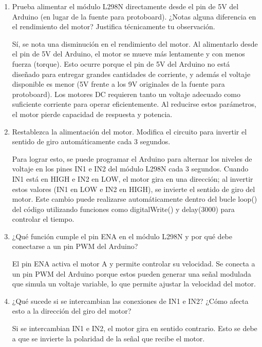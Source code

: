 \begin{enumerate}
    \item Prueba alimentar el módulo L298N directamente desde el pin de 5V del Arduino (en lugar de la fuente para protoboard). ¿Notas alguna diferencia en el rendimiento del motor? Justifica técnicamente tu observación.

    Sí, se nota una disminución en el rendimiento del motor. Al alimentarlo desde el pin de 5V del Arduino, el motor se mueve más lentamente y con menos fuerza (torque). Esto ocurre porque el pin de 5V del Arduino no está diseñado para entregar grandes cantidades de corriente, y además el voltaje disponible es menor (5V frente a los 9V originales de la fuente para protoboard). Los motores DC requieren tanto un voltaje adecuado como suficiente corriente para operar eficientemente. Al reducirse estos parámetros, el motor pierde capacidad de respuesta y potencia.

    \item Restablezca la alimentación del motor. Modiﬁca el circuito para invertir el sentido de giro automáticamente cada 3 segundos.

    Para lograr esto, se puede programar el Arduino para alternar los niveles de voltaje en los pines IN1 e IN2 del módulo L298N cada 3 segundos. Cuando IN1 está en HIGH e IN2 en LOW, el motor gira en una dirección; al invertir estos valores (IN1 en LOW e IN2 en HIGH), se invierte el sentido de giro del motor. Este cambio puede realizarse automáticamente dentro del bucle loop() del código utilizando funciones como digitalWrite() y delay(3000) para controlar el tiempo.
    
    \item ¿Qué función cumple el pin ENA en el módulo L298N y por qué debe conectarse a un pin PWM del Arduino?

    El pin ENA activa el motor A y permite controlar su velocidad. Se conecta a un pin PWM del Arduino porque estos pueden generar una señal modulada que simula un voltaje variable, lo que permite ajustar la velocidad del motor.

    \item ¿Qué sucede si se intercambian las conexiones de IN1 e IN2? ¿Cómo afecta esto a la dirección del giro del motor?

    Si se intercambian IN1 e IN2, el motor gira en sentido contrario. Esto se debe a que se invierte la polaridad de la señal que recibe el motor.

\end{enumerate}

